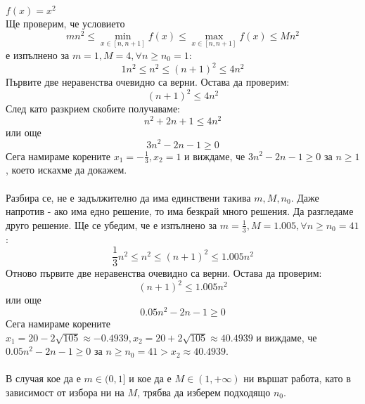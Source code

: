 \begin{example}
	$f(x)=x^2$\\\noindent
	Ще проверим, че условието
	\begin{equation}\label{eqn-well-distributed}
		mn^2\le\min\limits_{x\in[n,n+1]}f(x)\le\max\limits_{x\in[n,n+1]}f(x)\le Mn^2
	\end{equation}
	е изпълнено за $m=1,M=4,\forall n\ge n_0=1$:
	\begin{equation*}
		1n^2\le n^2\le (n+1)^2\le4n^2
	\end{equation*}
 	Първите две неравенства очевидно са верни. Остава да проверим:
 	\begin{equation*}
 		(n+1)^2\le4n^2
 	\end{equation*}
 	След като разкрием скобите получаваме:
 	\begin{equation*}
 		n^2+2n+1\le4n^2
 	\end{equation*}
 	или още
 	\begin{equation*}
 		3n^2-2n-1\ge0
 	\end{equation*}
 	Сега намираме корените $x_1=-\frac13,x_2=1$ и виждаме, че $3n^2-2n-1\ge0$ за $n\ge1$, което искахме да докажем.\\\\
 	\noindent
 	Разбира се, не е задължително да има единствени такива $m,M,n_0$. Даже напротив - ако има едно решение, то има безкрай много решения. Да разгледаме друго решение. Ще се убедим, че е изпълнено за $m=\frac13,M=1.005,\forall n\ge n_0=41$:
 	\begin{equation*}
 		\frac13n^2\le n^2\le (n+1)^2\le1.005n^2
 	\end{equation*}
 	Отново първите две неравенства очевидно са верни. Остава да проверим:
 	\begin{equation*}
 		(n+1)^2\le1.005n^2
 	\end{equation*}
 	или още
 	\begin{equation*}
 		0.05n^2-2n-1\ge0
 	\end{equation*}
 	Сега намираме корените $x_1=20-2\sqrt{105}\approx-0.4939,x_2=20+2\sqrt{105}\approx40.4939$ и виждаме, че $0.05n^2-2n-1\ge0$ за $n\ge n_0=41>x_2\approx40.4939$.\\\\
 	\noindent
 	В случая кое да е $m\in(0,1]$ и кое да е $M\in(1,+\infty)$ ни вършат работа, като в зависимост от избора ни на $M$, трябва да изберем подходящо $n_0$.
\end{example}\leavevmode\newline

